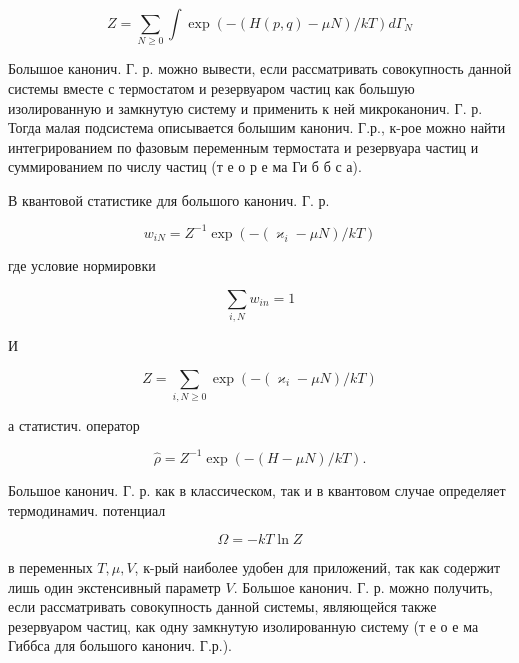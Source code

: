 \documentclass[10pt]{article}
\begin{document}
\[

Z=\sum_{N \geqslant 0} \int \exp (-(H(p, q)-\mu N) / k T) d \Gamma_{N}

\]



Болышое канонич. Г. р. можно вывести, если рассматривать совокупность данной системы вместе с термостатом и резервуаром частиц как большую изолированную и замкнутую систему и применить к ней микроканонич. Г. р. Тогда малая подсистема описывается болышим канонич. Г.р., к-рое можно найти интегрированием по фазовым переменным термостата и резервуара частиц и суммированием по числу частиц (т е о р е ма Ги б б с а).



В квантовой статистике для большого канонич. Г. р.



\[

w_{i N}=Z^{-1} \exp \left(-\left(\varkappa_{i}-\mu N\right) / k T\right)

\]



где условие нормировки



\[

\sum_{i, N} w_{i n}=1

\]



И



\[

Z=\sum_{i, N \geqslant 0} \exp \left(-\left(\varkappa_{i}-\mu N\right) / k T\right)

\]



а статистич. оператор



\[

\hat{\rho}=Z^{-1} \exp (-(H-\mu N) / k T) .

\]



Большое канонич. Г. р. как в классическом, так и в квантовом случае определяет термодинамич. потенциал



\[

\Omega=-k T \ln Z

\]



в переменных $T, \mu, V$, к-рый наиболее удобен для приложений, так как содержит лишь один экстенсивный параметр $V$. Большое канонич. Г. р. можно получить, если рассматривать совокупность данной системы, являющейся также резервуаром частиц, как одну замкнутую изолированную систему (т е о е ма Гиббса для большого канонич. Г.р.).
\end{document}
